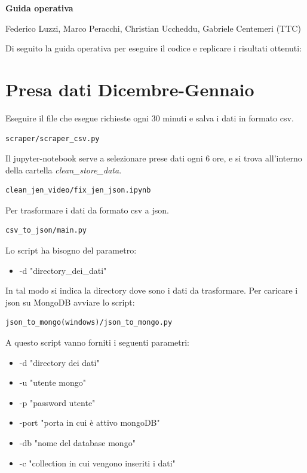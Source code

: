 \documentclass[10pt, a4paper,openany]{article}
\begin{document}
\begin{center}
{\Large\textbf{Guida operativa}}
\end{center}

\begin{center}
 Federico Luzzi,  Marco Peracchi, Christian Uccheddu, Gabriele Centemeri (TTC)
\end{center}
Di seguito la guida operativa per eseguire il codice e replicare i risultati ottenuti:

\section*{Presa dati Dicembre-Gennaio}

Eseguire il file che esegue richieste ogni 30 minuti e salva i dati in formato csv. 

\begin{verbatim}
scraper/scraper_csv.py
\end{verbatim}

Il jupyter-notebook serve a selezionare prese dati ogni 6 ore, e si trova all'interno della cartella \textit{clean\_store\_data}.

\begin{verbatim}
clean_jen_video/fix_jen_json.ipynb
\end{verbatim}

Per trasformare i dati da formato csv a json.

\begin{verbatim}
csv_to_json/main.py
\end{verbatim}

Lo script ha bisogno del parametro:

\begin{itemize}
	\item -d "directory\_dei\_dati"
\end{itemize}

In tal modo si indica la directory dove sono i dati da trasformare.
Per caricare i json su MongoDB avviare lo script:

\begin{verbatim}
json_to_mongo(windows)/json_to_mongo.py
\end{verbatim}

A questo script vanno forniti i seguenti parametri:

\begin{itemize}
	\item -d "directory dei dati"
	\item -u "utente mongo"
	\item -p "password utente"
	\item -port "porta in cui è attivo mongoDB"
	\item-db "nome del database mongo"
	\item -c "collection in cui vengono inseriti i dati"
\end{itemize}
\end{document}

